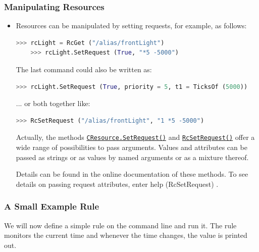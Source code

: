 \documentclass[12pt,english,parskip=half,headheight=19pt]{scrreprt}
\newcommand{\lstf}[1]{\colorbox{lstbackground}{\ttfamily\footnotesize#1}}
\newcommand{\refapipython}[1]{\href{home2l-api_python/index.html}{\mbox{\texttt{#1}}}}  %
\begin{document}
\subsubsection*{Manipulating Resources}

\begin{itemize}[$\blacktriangleright$]

\item
  Resources can be manipulated by setting requests, for example, as follows:
  \begin{lstlisting}[language=python]
    >>> rcLight = RcGet ("/alias/frontLight")
    >>> rcLight.SetRequest (True, "*5 -5000")
  \end{lstlisting}
  The last command could also be written as:
  \begin{lstlisting}[language=python]
    >>> rcLight.SetRequest (True, priority = 5, t1 = TicksOf (5000))
  \end{lstlisting}
  ... or both together like:
  \begin{lstlisting}[language=python]
  >>> RcSetRequest ("/alias/frontLight", "1 *5 -5000")
  \end{lstlisting}
  Actually, the methods \refapipython{CResource.SetRequest()} and \refapipython{RcSetRequest()}
  offer a wide range of possibilities to pass arguments. Values and attributes can be passed as strings
  or as values by named arguments or as a mixture thereof.

  Details can be found in the online documentation of these methods. To see details on passing
  request attributes, enter \lstf{help (RcSetRequest)} .

\end{itemize}



\subsubsection*{A Small Example Rule}

We will now define a simple rule on the command line and run it.
The rule monitors the current time and whenever the time changes, the value is printed out.
\end{document}
